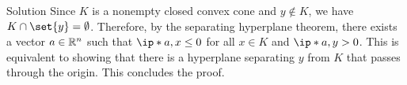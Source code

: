 \documentclass{article}
\begin{document}
\begin{solution}
    {Solution}
    Since $K$ is a nonempty closed convex cone and $y\notin K$, we have $K\cap\set{y}=\emptyset$. Therefore, by the separating hyperplane theorem, there exists a vector $a\in \mathbb{R}^n$ such that $\ip*{a,x}\leq 0$ for all $x\in K$ and $\ip*{a,y}>0$. This is equivalent to showing that there is a hyperplane separating $y$ from $K$ that passes through the origin. This concludes the proof.
\end{solution}
\end{document}
